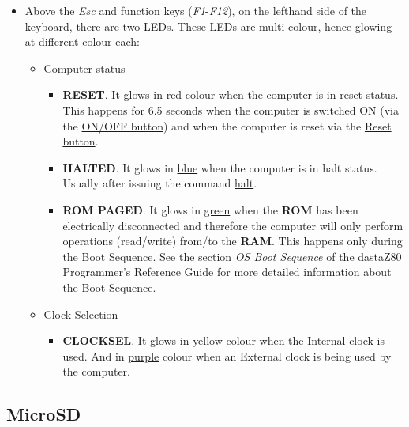     \begin{itemize}
        \item Above the \textit{Esc} and function keys (\textit{F1}-\textit{F12}),
        on the lefthand side of the keyboard, there are two LEDs. These LEDs are
        multi-colour, hence glowing at different colour each:
        \begin{itemize}
            \item Computer status
            \begin{itemize}
                \item \textbf{RESET}. It glows in \underline{red} colour when
                the computer is in reset status. This happens for 6.5 seconds
                when the computer is switched ON (via the
                \hyperref[subsec:onoffbutt]{ON/OFF button}) and when the
                computer is reset via the \hyperref[subsec:resetbutton]
                {Reset button}.
                \item \textbf{HALTED}. It glows in \underline{blue} when the
                computer is in halt status. Usually after issuing the command
                \hyperref[cmd:halt]{halt}.
                \item \textbf{ROM PAGED}. It glows in \underline{green} when the
                \textbf{ROM} has been electrically disconnected and therefore
                the computer will only perform operations (read/write) from/to
                the \textbf{RAM}. This happens only during the Boot Sequence.
                See the section \textit{OS Boot Sequence} of the dastaZ80
                Programmer's Reference Guide\cite{dastaz80progref} for more
                detailed information about the Boot Sequence.
            \end{itemize}
            \item Clock Selection
            \begin{itemize}
                \item \textbf{CLOCKSEL}. It glows in \underline{yellow} colour
                when the Internal clock is used. And in \underline{purple}
                colour when an External clock is being used by the computer.
            \end{itemize}
        \end{itemize}
    \end{itemize}

    \subsection{MicroSD}


